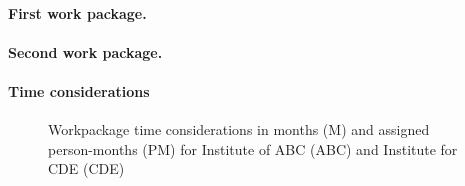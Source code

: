 \documentclass{scrartcl}
\begin{document}
\addtocounter{secnumdepth}{1}
\renewcommand{\theparagraph}{WP\arabic{paragraph}}

\hrulefill
\paragraph{First work package.}
\label{wp:1}



\hrulefill
\paragraph{Second work package.}
\label{wp:2}





\let\theparagraph=\oldpara
\paragraph*{Time considerations}
\vspace{-0.5cm}
\begin{figure}[h]
	\centering
  	\resizebox{\textwidth}{!}{}
	\caption{Workpackage time considerations in months (M) and assigned person-months (PM) for Institute of ABC (ABC) and Institute for CDE (CDE)}
	\label{fig:timeline}
\end{figure}
\end{document}
